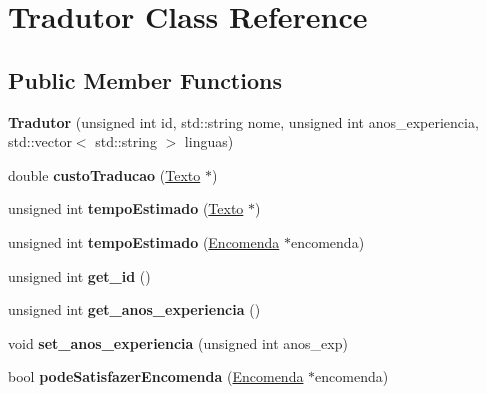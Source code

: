 \hypertarget{class_tradutor}{\section{Tradutor Class Reference}
\label{class_tradutor}
}
\subsection*{Public Member Functions}
\begin{DoxyCompactItemize}
\item 
\hypertarget{class_tradutor_a856f362e6c97ea42d04875e6c9d012e3}{{\bfseries Tradutor} (unsigned int id, std\-::string nome, unsigned int anos\-\_\-experiencia, std\-::vector$<$ std\-::string $>$ linguas)}\label{class_tradutor_a856f362e6c97ea42d04875e6c9d012e3}

\item 
\hypertarget{class_tradutor_a213336fc8d553cc286688f5dbbd467c3}{double {\bfseries custo\-Traducao} (\hyperlink{class_texto}{Texto} $\ast$)}\label{class_tradutor_a213336fc8d553cc286688f5dbbd467c3}

\item 
\hypertarget{class_tradutor_aad8db1d61a7505532cda73240d76412d}{unsigned int {\bfseries tempo\-Estimado} (\hyperlink{class_texto}{Texto} $\ast$)}\label{class_tradutor_aad8db1d61a7505532cda73240d76412d}

\item 
\hypertarget{class_tradutor_acd53cf00b851be61350100c9aa6ef3c0}{unsigned int {\bfseries tempo\-Estimado} (\hyperlink{class_encomenda}{Encomenda} $\ast$encomenda)}\label{class_tradutor_acd53cf00b851be61350100c9aa6ef3c0}

\item 
\hypertarget{class_tradutor_adc3d4f5ae46ebd92072c644f9fe0e479}{unsigned int {\bfseries get\-\_\-id} ()}\label{class_tradutor_adc3d4f5ae46ebd92072c644f9fe0e479}

\item 
\hypertarget{class_tradutor_a001f11f69661085cb11192d3c6f5d556}{unsigned int {\bfseries get\-\_\-anos\-\_\-experiencia} ()}\label{class_tradutor_a001f11f69661085cb11192d3c6f5d556}

\item 
\hypertarget{class_tradutor_a938cfc1c263b3504fc4d7fbdc939b087}{void {\bfseries set\-\_\-anos\-\_\-experiencia} (unsigned int anos\-\_\-exp)}\label{class_tradutor_a938cfc1c263b3504fc4d7fbdc939b087}

\item 
\hypertarget{class_tradutor_a1d22a38c8eaa3753d44b521bb3aab2af}{bool {\bfseries pode\-Satisfazer\-Encomenda} (\hyperlink{class_encomenda}{Encomenda} $\ast$encomenda)}\label{class_tradutor_a1d22a38c8eaa3753d44b521bb3aab2af}


\end{DoxyCompactItemize}
